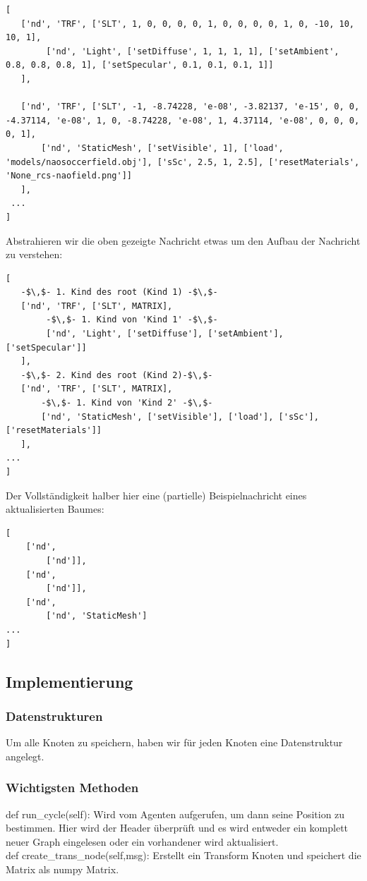 \begin{verbatim}[
   ['nd', 'TRF', ['SLT', 1, 0, 0, 0, 0, 1, 0, 0, 0, 0, 1, 0, -10, 10, 10, 1], 
        ['nd', 'Light', ['setDiffuse', 1, 1, 1, 1], ['setAmbient', 0.8, 0.8, 0.8, 1], ['setSpecular', 0.1, 0.1, 0.1, 1]]
   ],
   
   ['nd', 'TRF', ['SLT', -1, -8.74228, 'e-08', -3.82137, 'e-15', 0, 0, -4.37114, 'e-08', 1, 0, -8.74228, 'e-08', 1, 4.37114, 'e-08', 0, 0, 0, 0, 1], 
       ['nd', 'StaticMesh', ['setVisible', 1], ['load', 'models/naosoccerfield.obj'], ['sSc', 2.5, 1, 2.5], ['resetMaterials', 'None_rcs-naofield.png']]
   ],
 ...
]
\end{verbatim}
Abstrahieren wir die oben gezeigte Nachricht etwas um den Aufbau der Nachricht zu verstehen:

\begin{verbatim}[
   -$\,$- 1. Kind des root (Kind 1) -$\,$-
   ['nd', 'TRF', ['SLT', MATRIX], 
        -$\,$- 1. Kind von 'Kind 1' -$\,$-
        ['nd', 'Light', ['setDiffuse'], ['setAmbient'], ['setSpecular']]
   ],
   -$\,$- 2. Kind des root (Kind 2)-$\,$-
   ['nd', 'TRF', ['SLT', MATRIX], 
       -$\,$- 1. Kind von 'Kind 2' -$\,$-
       ['nd', 'StaticMesh', ['setVisible'], ['load'], ['sSc'], ['resetMaterials']]
   ],
...
]
\end{verbatim}
Der Vollständigkeit halber hier eine (partielle) Beispielnachricht eines aktualisierten Baumes:

\begin{verbatim}[
    ['nd', 
        ['nd']], 
    ['nd', 
        ['nd']], 
    ['nd', 
        ['nd', 'StaticMesh']
...
]
\end{verbatim}
\subsection{Implementierung}
\subsubsection{Datenstrukturen}
Um alle Knoten zu speichern, haben wir für jeden Knoten eine Datenstruktur angelegt.

\subsubsection{Wichtigsten Methoden}
def run\_cycle(self): Wird vom Agenten aufgerufen, um dann seine 
Position zu bestimmen. Hier wird der Header überprüft und es wird 
entweder ein komplett neuer Graph eingelesen oder ein vorhandener wird 
aktualisiert.\\
def create\_trans\_node(self,msg): Erstellt ein Transform Knoten und speichert die Matrix als numpy Matrix.


